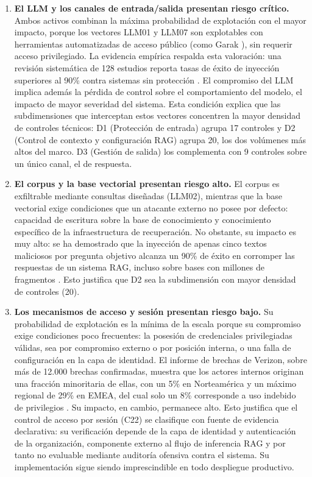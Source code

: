 \begin{enumerate}[leftmargin=2em]
  \item \textbf{El LLM y los canales de entrada/salida presentan riesgo crítico.} Ambos activos combinan la máxima probabilidad de explotación con el mayor impacto, porque los vectores LLM01 y LLM07 son explotables con herramientas automatizadas de acceso público (como Garak \cite{garak}), sin requerir acceso privilegiado. La evidencia empírica respalda esta valoración: una revisión sistemática de 128 estudios reporta tasas de éxito de inyección superiores al 90\% contra sistemas sin protección \cite{promptinjsurvey}. El compromiso del LLM implica además la pérdida de control sobre el comportamiento del modelo, el impacto de mayor severidad del sistema. Esta condición explica que las subdimensiones que interceptan estos vectores concentren la mayor densidad de controles técnicos: D1 (Protección de entrada) agrupa 17 controles y D2 (Control de contexto y configuración RAG) agrupa 20, los dos volúmenes más altos del marco. D3 (Gestión de salida) los complementa con 9 controles sobre un único canal, el de respuesta.
  \item \textbf{El corpus y la base vectorial presentan riesgo alto.} El corpus es exfiltrable mediante consultas diseñadas (LLM02), mientras que la base vectorial exige condiciones que un atacante externo no posee por defecto: capacidad de escritura sobre la base de conocimiento y conocimiento específico de la infraestructura de recuperación. No obstante, su impacto es muy alto: se ha demostrado que la inyección de apenas cinco textos maliciosos por pregunta objetivo alcanza un 90\% de éxito en corromper las respuestas de un sistema RAG, incluso sobre bases con millones de fragmentos \cite{poisonedrag}. Esto justifica que D2 sea la subdimensión con mayor densidad de controles (20).
  \item \textbf{Los mecanismos de acceso y sesión presentan riesgo bajo.} Su probabilidad de explotación es la mínima de la escala porque su compromiso exige condiciones poco frecuentes: la posesión de credenciales privilegiadas válidas, sea por compromiso externo o por posición interna, o una falla de configuración en la capa de identidad. El informe de brechas de Verizon, sobre más de 12.000 brechas confirmadas, muestra que los actores internos originan una fracción minoritaria de ellas, con un 5\% en Norteamérica y un máximo regional de 29\% en EMEA, del cual solo un 8\% corresponde a uso indebido de privilegios \cite{dbir2025}. Su impacto, en cambio, permanece alto. Esto justifica que el control de acceso por sesión (C22) se clasifique con fuente de evidencia declarativa: su verificación depende de la capa de identidad y autenticación de la organización, componente externo al flujo de inferencia RAG y por tanto no evaluable mediante auditoría ofensiva contra el sistema. Su implementación sigue siendo imprescindible en todo despliegue productivo.
\end{enumerate}

